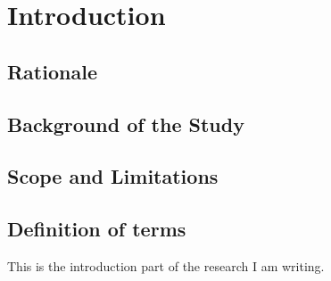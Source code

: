 \chapter{Introduction}


\section{Rationale}

\hspace{\parindent}\lipsum[1]

\section{Background of the Study}

\hspace{\parindent}\lipsum[2]

\section{Scope and Limitations}

\hspace{\parindent}\lipsum[3]

\section{Definition of terms}

\hspace{\parindent}This is the introduction part of the research I am writing. \cite{rosato}

\lipsum[1]
